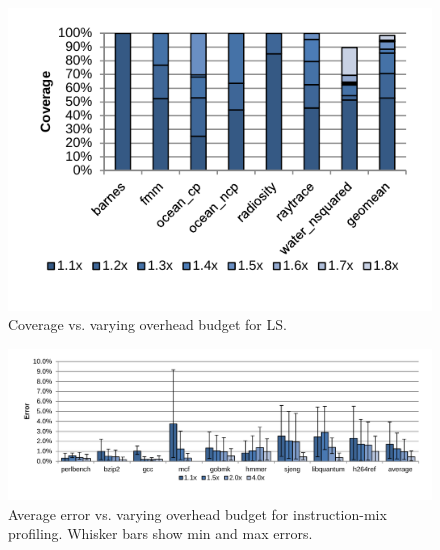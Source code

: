 \begin{figure}
  \begin{center}
    \includegraphics[width=\linewidth, clip=true, trim=0 0.3in 0 0.1in]{figs/data_ls_sweep.pdf}
    \vspace{-0.2in}
    \caption{Coverage vs. varying overhead budget for LS.}
    \label{fig:evaluation.ls_sweep}
    \vspace{-0.1in}
  \end{center}
\end{figure}

\begin{figure}
  \begin{center}
    \includegraphics[width=\linewidth, clip=true, trim=0 0.3in 0 0.1in]{figs/data_imp_sweep.pdf}
    \vspace{-0.2in}
    \caption{Average error vs. varying overhead budget for instruction-mix profiling. Whisker bars show min and max errors.}
    \label{fig:evaluation.imp_sweep}
    \vspace{-0.1in}
  \end{center}
\end{figure}

